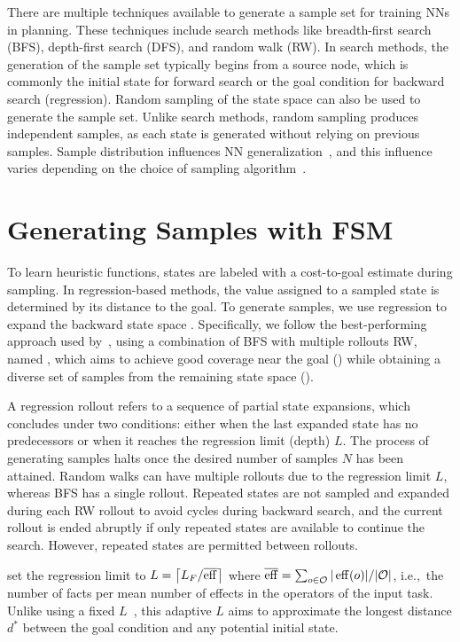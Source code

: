 \documentclass[ppgc,diss,english]{iiufrgs}
\providecommand{\ceil}[1]{\ensuremath{\left\lceil #1\right\rceil}}
\begin{document}
There are multiple techniques available to generate a sample set for training NNs in planning. These techniques include search methods like breadth-first search (BFS), depth-first search (DFS), and random walk (RW). In search methods, the generation of the sample set typically begins from a source node, which is commonly the initial state for forward search or the goal condition for backward search (regression). Random sampling of the state space can also be used to generate the sample set. Unlike search methods, random sampling produces independent samples, as each state is generated without relying on previous samples. Sample distribution influences NN generalization~\cite{Ferber.etal/2020a}, and this influence varies depending on the choice of sampling algorithm~\cite{Bettker.etal/2022}.

\section{Generating Samples with FSM}
\label{sec:sample-learn-h}
To learn heuristic functions, states are labeled with a cost-to-goal estimate during sampling. In regression-based methods, the value assigned to a sampled state is determined by its distance to the goal. To generate samples, we use regression to expand the backward state space \bsp. Specifically, we follow the best-performing approach used by~\citet{Bettker.etal/2022}, using a combination of BFS with multiple rollouts RW, named \bfsrw, which aims to achieve good coverage near the goal (\bfs) while obtaining a diverse set of samples from the remaining state space (\rw).

A regression rollout refers to a sequence of partial state expansions, which concludes under two conditions: either when the last expanded state has no predecessors or when it reaches the regression limit (depth) $L$. The process of generating samples halts once the desired number of samples $N$ has been attained. Random walks can have multiple rollouts due to the regression limit $L$, whereas BFS has a single rollout. Repeated states are not sampled and expanded during each RW rollout to avoid cycles during backward search, and the current rollout is ended abruptly if only repeated states are available to continue the search. However, repeated states are permitted between rollouts.

\citet{Bettker.etal/2022} set the regression limit to $L=\ceil{\facts/\overline{\eff}}$ where $\overline{\operatorname{eff}}=\sum_{o\in \mathcal{O}} |\operatorname{eff}(o)|/|\mathcal{O}|$, i.e.,~the number of facts per mean number of effects in the operators of the input task. Unlike using a fixed $L$~\cite{Yu.etal/2020, OToole/2022}, this adaptive $L$ aims to approximate the longest distance $d^{*}$ between the goal condition and any potential initial state.
\end{document}
